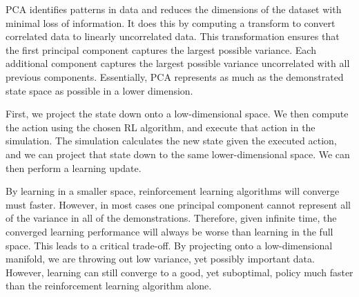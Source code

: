 \documentclass[10pt,a4paper]{article}
\begin{document}
PCA identifies patterns in data and reduces the dimensions of the dataset with minimal loss of information. It does this by computing a transform to convert correlated data to linearly uncorrelated data. This transformation ensures that the first principal component captures the largest possible variance. Each additional component captures the largest possible variance uncorrelated with all previous components. Essentially, PCA represents as much as the demonstrated state space as possible in a lower dimension. 


 

First, we project the state down onto a low-dimensional space. We then compute the action using the chosen RL algorithm, and execute that action in the simulation. The simulation calculates the new state given the executed action, and we can project that state down to the same lower-dimensional space.  We can then perform a learning update.

By learning in a smaller space, reinforcement learning algorithms will converge must faster. However, in most cases one principal component cannot represent all of the variance in all of the demonstrations. Therefore, given infinite time, the converged learning performance will always be worse than learning in the full space. This leads to a critical trade-off. By projecting onto a low-dimensional manifold, we are throwing out low variance, yet possibly important data. However, learning can still converge to a good, yet suboptimal, policy much faster than the reinforcement learning algorithm alone.
\end{document}
